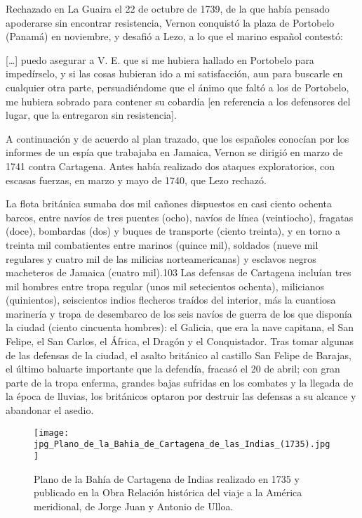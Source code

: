 Rechazado en La Guaira el 22 de octubre de 1739, de la que había
pensado apoderarse sin encontrar resistencia, Vernon conquistó la
plaza de Portobelo (Panamá) en noviembre, y desafió a Lezo, a lo que
el marino español contestó:

\begin{displayquote}
{[\ldots]} puedo asegurar a V. E. que si me hubiera hallado en Portobelo
para impedírselo, y si las cosas hubieran ido a mi satisfacción, aun
para buscarle en cualquier otra parte, persuadiéndome que el ánimo que
faltó a los de Portobelo, me hubiera sobrado para contener su cobardía
[en referencia a los defensores del lugar, que la entregaron sin
resistencia].
\end{displayquote}

A continuación y de acuerdo al plan trazado, que los españoles
conocían por los informes de un espía que trabajaba en Jamaica, Vernon
 se dirigió  en
marzo de 1741 contra Cartagena. Antes había realizado dos ataques
exploratorios, con escasas fuerzas, en marzo y mayo de 1740, que Lezo
rechazó.

La flota británica sumaba dos mil cañones dispuestos en casi ciento
ochenta barcos, entre navíos de tres puentes (ocho), navíos de línea
(veintiocho), fragatas (doce), bombardas (dos) y buques de transporte
(ciento treinta), y en torno a treinta mil combatientes entre marinos
(quince mil), soldados (nueve mil regulares y cuatro mil de las
milicias norteamericanas) y esclavos negros macheteros de Jamaica
(cuatro mil).103 Las defensas de Cartagena incluían tres mil hombres
entre tropa regular (unos mil setecientos ochenta), milicianos
(quinientos), seiscientos indios flecheros traídos del interior, más
la cuantiosa marinería y tropa de desembarco de los seis navíos de
guerra de los que disponía la ciudad (ciento cincuenta hombres): el
Galicia, que era la nave capitana, el San Felipe, el San Carlos, el
África, el Dragón y el Conquistador. Tras tomar algunas de las
defensas de la ciudad, el asalto británico al castillo San Felipe de
Barajas, el último baluarte importante que la defendía, fracasó el 20
de abril; con gran parte de la tropa enferma, grandes bajas sufridas
en los combates y la llegada de la época de lluvias, los británicos
optaron por destruir las defensas a su alcance y abandonar el
asedio.

\begin{figure}[!hbp]
\centering
\texttt{[image: jpg\_Plano\_de\_la\_Bahia\_de\_Cartagena\_de\_las\_Indias\_(1735).jpg]}
\caption{\label{fig:planoBahiaCartagena} Plano de la Bahía de
  Cartagena de Indias realizado en 1735 y publicado en la Obra
  Relación histórica del viaje a la América meridional, de Jorge Juan
  y Antonio de Ulloa.}
\end{figure}

